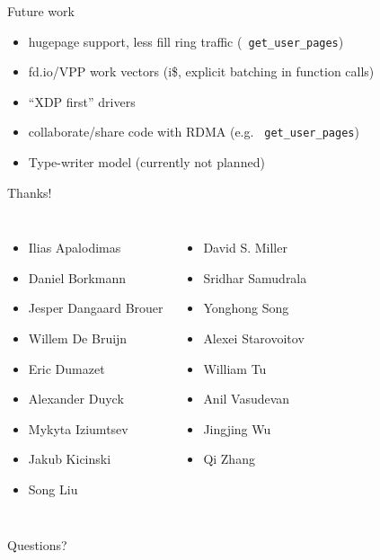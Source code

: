 \documentclass[aspectratio=169]{beamer}
\begin{document}
  \begin{frame}{Future work}
    \begin{itemize}
    \item hugepage support, less fill ring traffic ({\tt
      get\_user\_pages})
    \item fd.io/VPP work vectors (i\$, explicit batching in function calls)
    \item ``XDP first'' drivers 
    \item collaborate/share code with RDMA (e.g. {\tt
      get\_user\_pages})
    \item Type-writer model (currently not planned)
    \end{itemize}
  \end{frame}

  \begin{frame}{Thanks!}
  \begin{columns}[T,onlytextwidth]
    \begin{itemize}
    \item Ilias Apalodimas
    \item Daniel Borkmann
    \item Jesper Dangaard Brouer
    \item Willem De Bruijn
    \item Eric Dumazet
    \item Alexander Duyck
    \item Mykyta Iziumtsev
    \item Jakub Kicinski
    \item Song Liu
    \end{itemize}
    
    \begin{itemize}
    \item David S. Miller
    \item Sridhar Samudrala
    \item Yonghong Song
    \item Alexei Starovoitov
    \item William Tu
    \item Anil Vasudevan
    \item Jingjing Wu
    \item Qi Zhang
    \end{itemize}
  \end{columns}
  \end{frame}

  \begin{frame}[standout]
    Questions?
  \end{frame}
\end{document}
